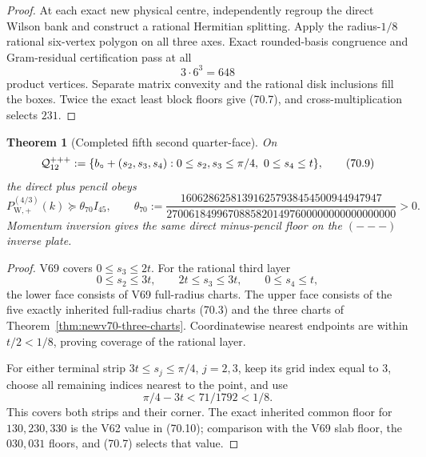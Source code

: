 \documentclass[11pt,oneside]{article}
\newtheorem{theorem}{Theorem}[section]
\theoremstyle{definition}
\theoremstyle{remark}
\begin{document}
\begin{proof}
At each exact new physical centre, independently regroup the direct
Wilson bank and construct a rational Hermitian splitting.  Apply
the radius-\(1/8\) rational six-vertex polygon on all three axes.
Exact rounded-basis congruence and Gram-residual certification pass
at all
\[
 3\cdot6^3=648                                        \tag{70.8}
\]
product vertices.  Separate matrix convexity and the rational disk
inclusions fill the boxes.  Twice the exact least block floors give
(70.7), and cross-multiplication selects \(231\).
\end{proof}

\begin{theorem}[Completed fifth second quarter-face]
\label{thm:newv70-second-face}
On
\[
 {\cal Q}^{+++}_{12}:=
 \{b_\circ+(s_2,s_3,s_4):
       0\le s_2,s_3\le\pi/4,\ 0\le s_4\le t\},        \tag{70.9}
\]
the direct plus pencil obeys
\[
 P_{\mathrm W,+}^{(4/3)}(k)
 \succeq\theta_{70}I_{45},\qquad
 \theta_{70}:=
 \frac{160628625813916257938454500944947947}
 {27006184996708858201497600000000000000000}>0.      \tag{70.10}
\]
Momentum inversion gives the same direct minus-pencil floor on the
\((---)\) inverse plate.
\end{theorem}

\begin{proof}
V69 covers \(0\le s_3\le2t\).  For the rational third layer
\[
 0\le s_2\le3t,\qquad2t\le s_3\le3t,\qquad
 0\le s_4\le t,                                       \tag{70.11}
\]
the lower face consists of V69 full-radius charts.  The upper face
consists of the five exactly inherited full-radius charts (70.3)
and the three charts of Theorem~\ref{thm:newv70-three-charts}.
Coordinatewise nearest endpoints are within \(t/2<1/8\), proving
coverage of the rational layer.

For either terminal strip \(3t\le s_j\le\pi/4\),
\(j=2,3\), keep its grid index equal to \(3\), choose all remaining
indices nearest to the point, and use
\[
 \pi/4-3t<71/1792<1/8.                               \tag{70.12}
\]
This covers both strips and their corner.  The exact inherited
common floor for \(130,230,330\) is the V62 value in (70.10);
comparison with the V69 slab floor, the \(030,031\) floors, and
(70.7) selects that value.
\end{proof}
\end{document}
